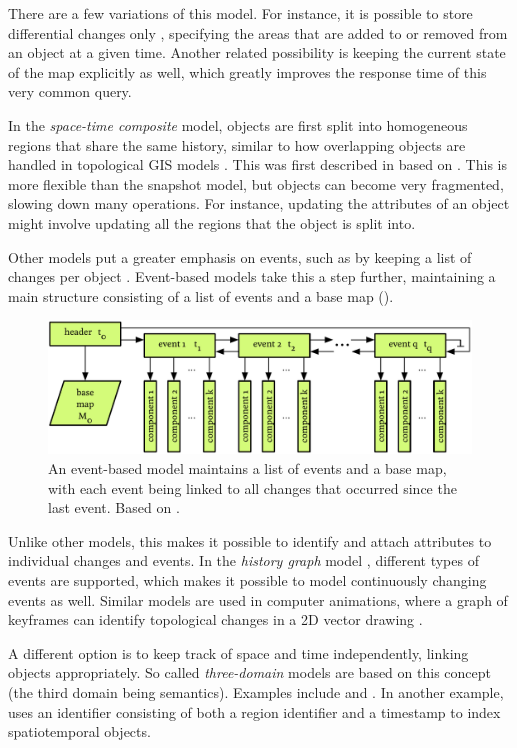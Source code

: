 There are a few variations of this model.
For instance, it is possible to store differential changes only \citep{Langran88}, specifying the areas that are added to or removed from an object at a given time.
Another related possibility is keeping the current state of the map explicitly as well, which greatly improves the response time of this very common query.

In the \emph{space-time composite} model, objects are first split into homogeneous regions that share the same history, similar to how overlapping objects are handled in topological GIS models \citep{Rossignac89}.
This was first described in \citet{Chrisman83} based on \citet{Peucker75}.
This is more flexible than the snapshot model, but objects can become very fragmented, slowing down many operations.
For instance, updating the attributes of an object might involve updating all the regions that the object is split into.

Other models put a greater emphasis on events, such as by keeping a list of changes per object \citep{Worboys92,Peuquet94}.
Event-based models \citep{Peuquet95} take this a step further, maintaining a main structure consisting of a list of events and a base map ().
\begin{figure}[tbp]
\centering
\includegraphics[width=\linewidth]{figs/st_events}
\caption[An event-based model]{An event-based model maintains a list of events and a base map, with each event being linked to all changes that occurred since the last event. Based on \citet{Peuquet95}.}
\label{fig:st_events}
\end{figure}
Unlike other models, this makes it possible to identify and attach attributes to individual changes and events.
In the \emph{history graph} model \citep{Renolen96}, different types of events are supported, which makes it possible to model continuously changing events as well.
Similar models are used in computer animations, where a graph of keyframes can identify topological changes in a 2D vector drawing \citep{Dalstein15}.

A different option is to keep track of space and time independently, linking objects appropriately.
So called \emph{three-domain} models are based on this concept (the third domain being semantics).
Examples include \citet{Yuan94} and \citet{Claramunt95}.
In another example, \citet{vanOosterom97} uses an identifier consisting of both a region identifier and a timestamp to index spatiotemporal objects.

